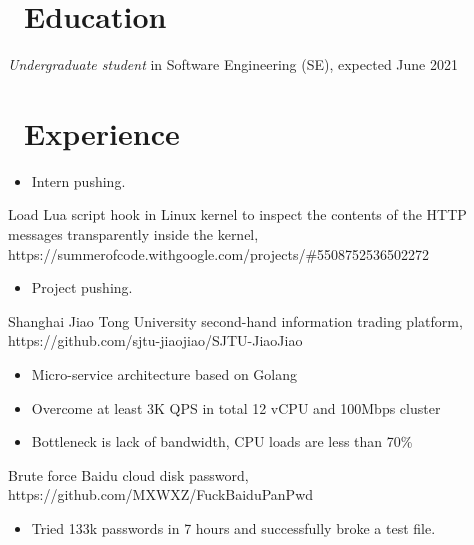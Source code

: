 \documentclass{resume}
\begin{document}



\section{\faGraduationCap\ Education}
\textit{Undergraduate student} in Software Engineering (SE), expected June 2021

\section{\faUsers\ Experience}
\begin{itemize}
    \item Intern pushing.
\end{itemize}

Load Lua script hook in Linux kernel to inspect the contents of the HTTP messages transparently inside the kernel, https://summerofcode.withgoogle.com/projects/\#5508752536502272
\begin{itemize}
    \item Project pushing.
\end{itemize}

Shanghai Jiao Tong University second-hand information trading platform, https://github.com/sjtu-jiaojiao/SJTU-JiaoJiao
\begin{itemize}
    \item Micro-service architecture based on Golang
    \item Overcome at least 3K QPS in total 12 vCPU and 100Mbps cluster
    \item Bottleneck is lack of bandwidth, CPU loads are less than 70\%
\end{itemize}

Brute force Baidu cloud disk password, https://github.com/MXWXZ/FuckBaiduPanPwd
\begin{itemize}
    \item Tried 133k passwords in 7 hours and successfully broke a test file.
\end{itemize}
\end{document}
